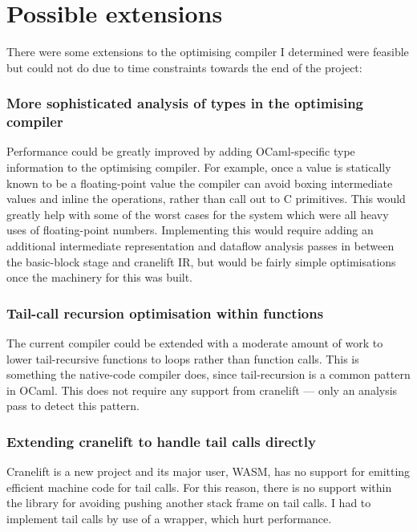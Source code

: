 \section{Possible extensions}

There were some extensions to the optimising compiler I determined were feasible but could not do
due to time constraints towards the end of the project:

\subsubsection{More sophisticated analysis of types in the optimising compiler}

Performance could be greatly improved by adding OCaml-specific type information to the optimising
compiler. For example, once a value is statically known to be a floating-point value the compiler
can avoid boxing intermediate values and inline the operations, rather than call out to C
primitives. This would greatly help with some of the worst cases for the system which were all
heavy uses of floating-point numbers. Implementing this would require adding an additional
intermediate representation and dataflow analysis passes in between the basic-block stage and
cranelift IR, but would be fairly simple optimisations once the machinery for this was built.

\subsubsection{Tail-call recursion optimisation within functions}

The current compiler could be extended with a moderate amount of work to lower tail-recursive
functions to loops rather than function calls. This is something the native-code compiler does,
since tail-recursion is a common pattern in OCaml. This does not require any support from cranelift
--- only an analysis pass to detect this pattern.

\subsubsection{Extending cranelift to handle tail calls directly}

Cranelift is a new project and its major user, WASM, has no support for emitting efficient machine
code for tail calls.  For this reason, there is no support within the library for avoiding pushing
another stack frame on tail calls. I had to implement tail calls by use of a wrapper, which hurt
performance.